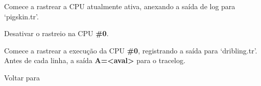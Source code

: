 \documentclass[letterpaper,10pt,brazil]{sphinxmanual}
\begin{document}
\begin{DUlineblock}{0em}
\item[] 
\item[]
\begin{DUlineblock}{\DUlineblockindent}
\item[] 
\item[] 
\end{DUlineblock}
\item[] Comece a rastrear a CPU atualmente ativa, anexando a saída de log para `pigskin.tr'.
\item[] 
\item[]
\begin{DUlineblock}{\DUlineblockindent}
\item[] 
\item[] 
\end{DUlineblock}
\item[] Desativar o rastreio na CPU \textbf{\#0}.
\item[] 
\item[]
\begin{DUlineblock}{\DUlineblockindent}
\item[] 
\item[] 
\item[] 
\item[] 
\item[] 
\end{DUlineblock}
\item[] Comece a rastrear a execução da CPU \textbf{\#0}, registrando a saída para `dribling.tr'. Antes de cada linha, a saída \textbf{A=\textless{}aval\textgreater{}} para o tracelog.
\item[] 
\item[] Voltar para {\hyperref[debugger/execution:debugger\string-execution\string-list]{}}
\end{DUlineblock}
\begin{quote}
\label{debugger/execution:debugger-command-traceover}\end{quote}
\end{document}
